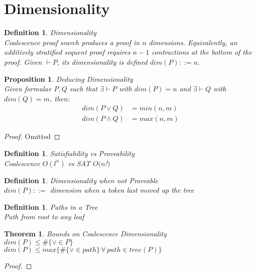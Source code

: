 \documentclass{article}
\def\defeq{::=}
\theoremstyle{indented}
\newtheorem{theorem}[sec-ctr]{Theorem}
\newtheorem{definition}[sec-ctr]{Definition}
\newtheorem{proposition}[sec-ctr]{Proposition}
\begin{document}


    \section{Dimensionality}
        
        \begin{definition}{Dimensionality\\}
            Coalescence proof search produces a proof in $n$ dimensions.
            Equivalently, an additively stratified sequent proof requires $n - 1$ contractions at the bottom of the proof.
            Given $\vdash P$, its dimensionality is defined $dim(P) \defeq n$.
        \end{definition}


        \begin{proposition}{Deducing Dimensionality\\}
            Given formulae $P, Q$ such that $\exists \vdash P$ with $dim(P) = n$ and $\exists \vdash Q$ with $dim(Q) = m$, then:
            \begin{align*}
                dim(P \vee Q) &= min(n, m) \\
                dim(P \wedge Q) &= max(n, m)
            \end{align*}
        \end{proposition}

        \begin{proof}
            Omitted
        \end{proof}


        \begin{definition}{Satisfiability vs Proveability\\}
            Coalescence $O(l^n)$ vs SAT $O(n$!$)$
        \end{definition}
        
        
        \begin{definition}{Dimensionality when not Proveable\\}
            $dim(P) \defeq$ dimension when a token last moved up the tree
        \end{definition}


        \begin{definition}{Paths in a Tree\\}
            Path from root to any leaf
        \end{definition}


        \begin{theorem}{Bounds on Coalescence Dimensionality\\}
            $dim(P) \leq \#\{\vee \in P\}$ \\
            $dim(P) \leq max\{\#\{\vee \in path\} \, \forall \, path \in tree(P)\}$

        \end{theorem}

        \begin{proof}
        \end{proof}
\end{document}
